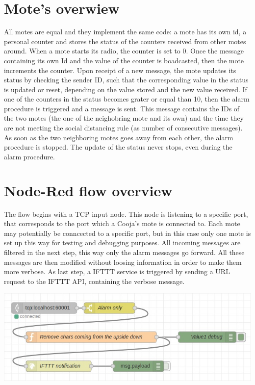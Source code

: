 \documentclass[11pt]{article}
\begin{document}
\section{Mote's overwiew}
All motes are equal and they implement the same code: \newline
a mote has its own id, a personal counter and stores the status of the counters received from other motes around. \newline
When a mote starts its radio, the counter is set to 0. Once the message containing its own Id and the value of the counter is boadcasted, then the mote increments the counter. \newline
Upon receipt of a new message, the mote updates its status by checking the sender ID, such that the corresponding value in the status is updated or reset, depending on the value stored and the new value received. \newline
If one of the counters in the status becomes grater or equal than 10, then the alarm procedure is triggered and a message is sent. This message contains the IDs of the two motes (the one of the neighobring mote and its own) and the time they are not meeting the social distancing rule (as number of consecutive messages). \newline
As soon as the two neighboring motes goes away from each other, the alarm procedure is stopped. The update of the status never stops, even during the alarm procedure.

\section{Node-Red flow overview}
The flow begins with a TCP input node. This node is listening to a specific port, that corresponds to the port which a Cooja's mote is connected to. Each mote may potentially be conncected to a specific port, but in this case only one mote is set up this way for testing and debugging purposes. \newline
All incoming messages are filtered in the next step, this way only the alarm messages go forward. All these messages are then modified without loosing information in order to make them more verbose. \newline
As last step, a IFTTT service is triggered by sending a URL request to the IFTTT API, containing the verbose message. \newline

\includegraphics{Node-red-flow}
\end{document}

